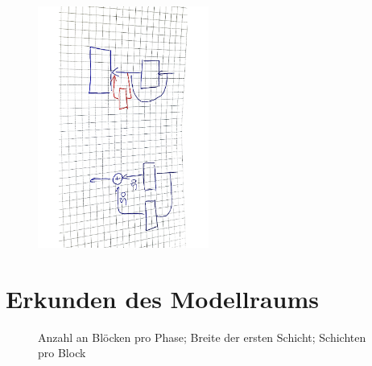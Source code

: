 \begin{figure}[h]
 \centering
 \includegraphics[width=0.5\textwidth, angle=90]{KapitelPartB/Images/deeper.pdf}
 \label{abb:deeper}
\end{figure}




\section{Erkunden des Modellraums}

 \begin{figure}
     \centering
     \caption{Anzahl an Blöcken pro Phase; Breite der ersten Schicht; Schichten pro Block}
     \hfill
\end{figure}

